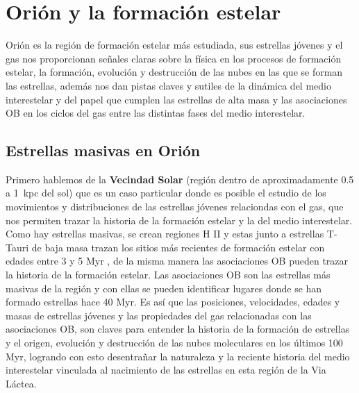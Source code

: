 \section{Orión y la formación estelar}
\label{sec:formation} 


Orión es la región de formación estelar más estudiada, sus estrellas jóvenes y el gas nos proporcionan señales claras sobre la física en los procesos de formación estelar, la formación, evolución  y destrucción de las nubes en las que se forman las estrellas, además nos dan pistas claves y sutiles de la dinámica del medio interestelar y del papel que cumplen las estrellas de alta masa y las asociaciones OB en los ciclos del gas entre las distintas fases del medio interestelar.\\

\subsection{Estrellas masivas en Orión}
\label{sec:star}

Primero hablemos de la \textbf{Vecindad Solar} (región dentro de aproximadamente 0.5 a 1~kpc del sol) que es un caso particular donde es posible el estudio de los movimientos y distribuciones de las estrellas jóvenes relaciondas con el gas, que nos permiten trazar la historia de la formación estelar y la del medio interestelar. Como hay estrellas masivas, se crean regiones H II y estas junto a estrellas T-Tauri de baja masa trazan los sitios más recientes de formación estelar con edades entre 3 y 5 Myr \citep{Bally:2008a}, de la misma manera las asociaciones OB pueden trazar la historia de la formación estelar. Las asociaciones OB son las estrellas más masivas de la región y con ellas se pueden identificar lugares donde se han formado estrellas hace 40 Myr. Es así que las posiciones, velocidades, edades y masas de estrellas jóvenes y las propiedades del gas relacionadas con las asociaciones OB, son claves para entender la historia de la formación de estrellas y el origen, evolución y destrucción de las nubes moleculares en los últimos 100 Myr, logrando con esto desentrañar la naturaleza y la reciente historia del medio interestelar vinculada al nacimiento de las estrellas en esta región de la Via Láctea.\\

